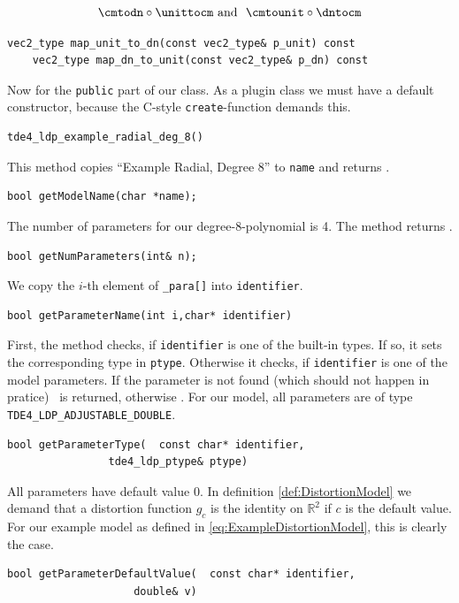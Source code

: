 \documentclass[10pt,a4paper]{article}
\newcommand{\Rpow}[1]{\mathbb{R}^{#1}}
\begin{document}
\begin{equation}
\cmtodn \circ \unittocm \text{\ and \ } \cmtounit \circ \dntocm
\end{equation}
\begin{lstlisting}[language=mycpp,tabsize=8,]
	vec2_type map_unit_to_dn(const vec2_type& p_unit) const
	vec2_type map_dn_to_unit(const vec2_type& p_dn) const
\end{lstlisting}
Now for the {\tt public} part of our class.
As a plugin class we must have a default constructor, because
the C-style {\tt create}-function demands this.
\begin{lstlisting}[language=mycpp,tabsize=8]
	tde4_ldp_example_radial_deg_8()
\end{lstlisting}
This method copies ``Example Radial, Degree 8'' to {\tt name} and returns \true.
\begin{lstlisting}[language=mycpp,tabsize=8]
	bool getModelName(char *name);
\end{lstlisting}
The number of parameters for our degree-8-polynomial is 4.
The method returns \true.
\begin{lstlisting}[language=mycpp,tabsize=8]
	bool getNumParameters(int& n);
\end{lstlisting}
We copy the $i$-th element of {\tt\_para[]} into {\tt identifier}.
\begin{lstlisting}[language=mycpp,tabsize=8]
	bool getParameterName(int i,char* identifier)
\end{lstlisting}
First, the method checks, if {\tt identifier} is one of the built-in types.
If so, it sets the corresponding type in {\tt ptype}. Otherwise
it checks, if {\tt identifier} is one of the model parameters.
If the parameter is not found (which should not happen in pratice)
\false\ is returned, otherwise \true. For our model, all parameters
are of type {\tt TDE4\_LDP\_ADJUSTABLE\_DOUBLE}.
\begin{lstlisting}[language=mycpp,tabsize=8]
	bool getParameterType(	const char* identifier,
				tde4_ldp_ptype& ptype)
\end{lstlisting}
All parameters have default value 0. In definition \ref{def:DistortionModel}
we demand that a distortion function $g_c$ is the identity on $\Rpow{2}$
if $c$ is the default value. For our example model as defined in 
\eqref{eq:ExampleDistortionModel}, this is clearly the case.
\begin{lstlisting}[language=mycpp,tabsize=8]
	bool getParameterDefaultValue(	const char* identifier,
					double& v)
\end{lstlisting}
\end{document}
